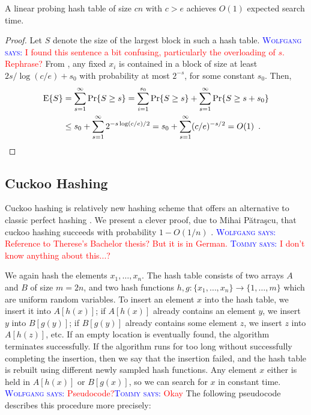 \documentclass{patmorin}
\newcommand{\aremark}[3]{\textcolor{blue}{\textsc{#1 #2:}}
  \textcolor{red}{\textsf{#3}}}
\newcommand{\tommy}[2][says]{\aremark{Tommy}{#1}{#2}}
\newcommand{\wolfgang}[2][says]{\aremark{Wolfgang}{#1}{#2}}
\begin{document}
\begin{cor}
  A linear probing hash table of size $cn$ with $c > e$ achieves
  $O(1)$ expected search time.
\end{cor}
\begin{proof}
  Let $S$ denote the size of the largest block in such a hash
  table. 
  \wolfgang{I found this sentence a bit confusing, particularly 
  the overloading of $s$. Rephrase?}
  From , any fixed $x_i$ is contained in
  a block of size at least $2s/\log (c/e) + s_0$ with probability at
  most $2^{-s}$, for some constant $s_0$. Then,
  \begin{align*}
    \operatorname{\mathrm{E}}\{S\} &= \sum_{s = 1}^\infty \Pr\{S \ge s\} = \sum_{i=1}^{s_0} \Pr\{S \ge s\} + \sum_{s = 1}^\infty \Pr\{S \ge s + s_0\} \\
            &\le s_0 + \sum_{s = 1}^\infty 2^{-s \log (c/e)/2} = s_0 + \sum_{s = 1}^\infty (c/e)^{-s/2} = O(1) \enspace . \qedhere
  \end{align*}
\end{proof}

\subsection{Cuckoo Hashing}

Cuckoo hashing is relatively new hashing scheme that offers an
alternative to classic perfect hashing \cite{pagh.rodler:cuckoo}. 
We present a clever proof, due to Mihai Pătraşcu, that cuckoo hashing
succeeds with probability $1-O(1/n)$ \cite{patrascu:cuckoo}.
\wolfgang{Reference to Therese's Bachelor thesis? But it is in
German.} \tommy{I don't know anything about this...?}


We again hash the elements $x_1, \ldots, x_n$. The hash table consists
of two arrays $A$ and $B$ of size $m = 2n$, and two hash functions
$h, g : \{x_1, \ldots, x_n\} \to \{1, \ldots, m\}$ which are uniform
random variables. To insert an element $x$ into the hash table, we
insert it into $A[h(x)]$; if $A[h(x)]$ already contains an element
$y$, we insert $y$ into $B[g(y)]$; if $B[g(y)]$ already contains some
element $z$, we insert $z$ into $A[h(z)]$, etc. If an empty location
is eventually found, the algorithm terminates successfully. If the
algorithm runs for too long without successfully completing the
insertion, then we say that the insertion failed, and the hash table
is rebuilt using different newly sampled hash functions. Any element
$x$ either is held in $A[h(x)]$ or $B[g(x)]$, so we can search for $x$
in constant time.  \wolfgang{Pseudocode?}\tommy{Okay} The following
pseudocode describes this procedure more precisely:
\end{document}
